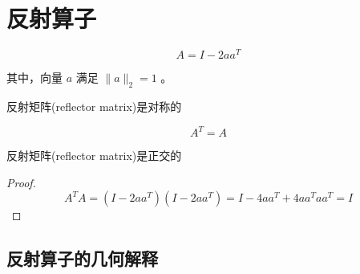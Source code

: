 \section{反射算子}

\begin{definition}[Reflector]
    $$
A=I-2 a a^{T}
$$

其中，向量 $ a $ 满足 $ \|a\|_{2}=1 $ 。
\end{definition}

\begin{theorem}
    反射矩阵(reflector matrix)是对称的

    $$A^T=A$$
\end{theorem}

\begin{theorem}
    反射矩阵(reflector matrix)是正交的

\end{theorem}

\begin{proof}
    $$ A^{T} A=\left(I-2 a a^{T}\right)\left(I-2 a a^{T}\right)=I-4 a a^{T}+4 a a^{T} a a^{T}=I $$
\end{proof}

\subsection{反射算子的几何解释}




